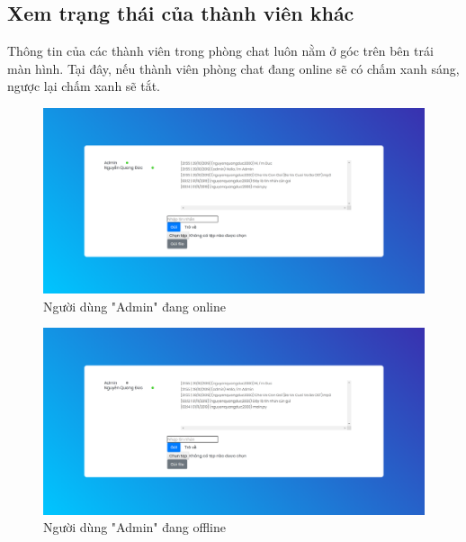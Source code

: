 \documentclass[a4paper]{article}
\begin{document}
	\subsection{Xem trạng thái của thành viên khác}
	Thông tin của các thành viên trong phòng chat luôn nằm ở góc trên bên trái màn hình. Tại đây, nếu thành viên phòng chat đang online sẽ có chấm xanh sáng, ngược lại chấm xanh sẽ tắt.
	
	\begin{figure}[H]
		\centering
		\includegraphics[scale=0.36]{user_status_online.png}
		\caption{Người dùng "Admin" đang online}
		\label{F:user_status_online}
	\end{figure}
	
	\begin{figure}[H]
		\centering
		\includegraphics[scale=0.36]{user_status_offline.png}
		\caption{Người dùng "Admin" đang offline}
		\label{F:user_status_offline}
	\end{figure}
	
\end{document}
